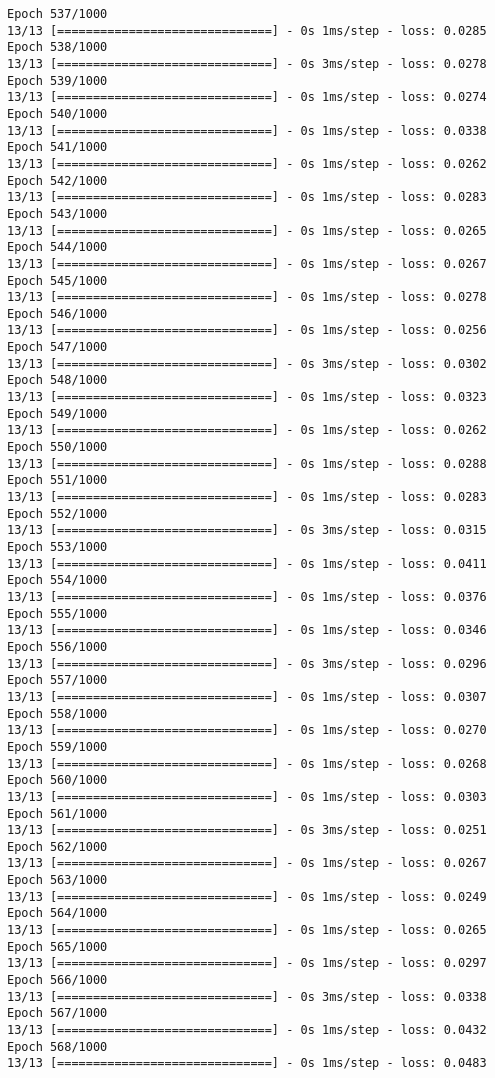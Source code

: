 \documentclass[11pt]{article}
\begin{document}
\begin{Verbatim}[commandchars=\\\{\}]
Epoch 537/1000
13/13 [==============================] - 0s 1ms/step - loss: 0.0285
Epoch 538/1000
13/13 [==============================] - 0s 3ms/step - loss: 0.0278
Epoch 539/1000
13/13 [==============================] - 0s 1ms/step - loss: 0.0274
Epoch 540/1000
13/13 [==============================] - 0s 1ms/step - loss: 0.0338
Epoch 541/1000
13/13 [==============================] - 0s 1ms/step - loss: 0.0262
Epoch 542/1000
13/13 [==============================] - 0s 1ms/step - loss: 0.0283
Epoch 543/1000
13/13 [==============================] - 0s 1ms/step - loss: 0.0265
Epoch 544/1000
13/13 [==============================] - 0s 1ms/step - loss: 0.0267
Epoch 545/1000
13/13 [==============================] - 0s 1ms/step - loss: 0.0278
Epoch 546/1000
13/13 [==============================] - 0s 1ms/step - loss: 0.0256
Epoch 547/1000
13/13 [==============================] - 0s 3ms/step - loss: 0.0302
Epoch 548/1000
13/13 [==============================] - 0s 1ms/step - loss: 0.0323
Epoch 549/1000
13/13 [==============================] - 0s 1ms/step - loss: 0.0262
Epoch 550/1000
13/13 [==============================] - 0s 1ms/step - loss: 0.0288
Epoch 551/1000
13/13 [==============================] - 0s 1ms/step - loss: 0.0283
Epoch 552/1000
13/13 [==============================] - 0s 3ms/step - loss: 0.0315
Epoch 553/1000
13/13 [==============================] - 0s 1ms/step - loss: 0.0411
Epoch 554/1000
13/13 [==============================] - 0s 1ms/step - loss: 0.0376
Epoch 555/1000
13/13 [==============================] - 0s 1ms/step - loss: 0.0346
Epoch 556/1000
13/13 [==============================] - 0s 3ms/step - loss: 0.0296
Epoch 557/1000
13/13 [==============================] - 0s 1ms/step - loss: 0.0307
Epoch 558/1000
13/13 [==============================] - 0s 1ms/step - loss: 0.0270
Epoch 559/1000
13/13 [==============================] - 0s 1ms/step - loss: 0.0268
Epoch 560/1000
13/13 [==============================] - 0s 1ms/step - loss: 0.0303
Epoch 561/1000
13/13 [==============================] - 0s 3ms/step - loss: 0.0251
Epoch 562/1000
13/13 [==============================] - 0s 1ms/step - loss: 0.0267
Epoch 563/1000
13/13 [==============================] - 0s 1ms/step - loss: 0.0249
Epoch 564/1000
13/13 [==============================] - 0s 1ms/step - loss: 0.0265
Epoch 565/1000
13/13 [==============================] - 0s 1ms/step - loss: 0.0297
Epoch 566/1000
13/13 [==============================] - 0s 3ms/step - loss: 0.0338
Epoch 567/1000
13/13 [==============================] - 0s 1ms/step - loss: 0.0432
Epoch 568/1000
13/13 [==============================] - 0s 1ms/step - loss: 0.0483

\end{Verbatim}
\end{document}
